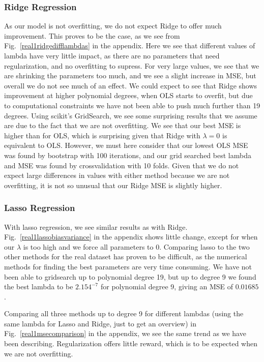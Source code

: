 \documentclass[twocolumn,10pt,cleanfoot]{asme2ej}
\begin{document}
\subsubsection{Ridge Regression}

As our model is not overfitting, we do not expect Ridge to offer much improvement. This proves to be the case, as we see from Fig.~\ref{real1ridgedifflambdas} in the appendix. Here we see that different values of lambda have very little impact, as there are no parameters that need regularization, and no overfitting to supress. For very large values, we see that we are shrinking the parameters too much, and we see a slight increase in MSE, but overall we do not see much of an effect. We could expect to see that Ridge shows improvement at higher polynomial degrees, when OLS starts to overfit, but due to computational constraints we have not been able to push much further than 19 degrees. Using scikit's GridSearch, we see some surprising results that we assume are due to the fact that we are not overfitting. We see that our best MSE is higher than for OLS, which is surprising given that Ridge with $\lambda = 0$ is equivalent to OLS. However, we must here consider that our lowest OLS MSE was found by bootstrap with 100 iterations, and our grid searched best lambda and MSE was found by crossvalidation with 10 folds. Given that we do not expect large differences in values with either method because we are not overfitting, it is not so unusual that our Ridge MSE is slightly higher.

\subsubsection{Lasso Regression}

With lasso regression, we see similar results as with Ridge. Fig.~\ref{real1lassobiasvariance} in the appendix shows little change, except for when our $\lambda$ is too high and we force all parameters to $0$. Comparing lasso to the two other methods for the real dataset has proven to be difficult, as the numerical methods for finding the best parameters are very time consuming. We have not been able to gridsearch up to polynomial degree 19, but up to degree 9 we found the best lambda to be $2.154^{-7}$ for polynomial degree 9, giving an MSE of $0.01685$.

Comparing all three methods up to degree 9 for different lambdas (using the same lambda for Lasso and Ridge, just to get an overview) in Fig.~\ref{real1msecomparison} in the appendix, we see the same trend as we have been describing. Regularization offers little reward, which is to be expected when we are not overfitting.
\end{document}
